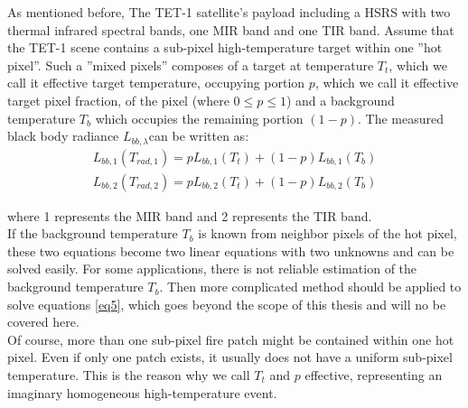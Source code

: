 \noindent As mentioned before, The TET-1 satellite's payload including a HSRS with two thermal infrared spectral bands, one MIR band and one TIR band. Assume that the TET-1 scene contains a sub-pixel high-temperature target within one ''hot pixel''. Such a ''mixed pixels'' composes of a target at temperature $T_t$, which we call it effective target temperature, occupying portion $p$, which we call it effective target pixel fraction, of the pixel (where $0 \leqslant p \leqslant 1$) and a background temperature $T_b$ which occupies the remaining portion $(1 - p)$. The measured black body radiance $L_{bb, \lambda}$can be written as:\\
\begin{equation}
\begin{aligned}
\label{eq5}
L_{bb, 1}(T_{rad, 1}) = pL_{bb, 1}(T_t) + (1 - p)L_{bb, 1}(T_b)\\
L_{bb, 2}(T_{rad, 2}) = pL_{bb, 2}(T_t) + (1 - p)L_{bb, 2}(T_b)
\end{aligned}
\end{equation}

\noindent where 1 represents the MIR band and 2 represents the TIR band.\\

\noindent If the background temperature $T_b$ is known from neighbor pixels of the hot pixel, these two equations become two linear equations with two unknowns and can be solved easily. For some applications, there is not reliable estimation of the background temperature $T_b$. Then more complicated method should be applied to solve equations \eqref{eq5}, which goes beyond the scope of this thesis and will no be covered here.\\

\noindent Of course, more than one sub-pixel fire patch might be contained within one hot pixel. Even if only one patch exists, it usually does not have a uniform sub-pixel temperature. This is the reason why we call $T_t$ and $p$ effective, representing an imaginary homogeneous high-temperature event.\\


